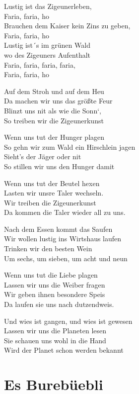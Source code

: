 \documentclass[
  letterpaper,
  twoside=false]{scrbook}
\begin{document}
Lustig ist das Zigeunerleben,\\
Faria, faria, ho\\
Brauchen dem Kaiser kein Zins zu geben,\\
Faria, faria, ho\\
Lustig ist´s im grünen Wald\\
wo des Zigeuners Aufenthalt\\
Faria, faria, faria, faria,\\
Faria, faria, ho

Auf dem Stroh und auf dem Heu\\
Da machen wir uns das größte Feur\\
Blinzt uns nit als wie die Sonn`,\\
So treiben wir die Zigeunerkunst

Wenn uns tut der Hunger plagen\\
So gehn wir zum Wald ein Hirschlein jagen\\
Sieht's der Jäger oder nit\\
So stillen wir uns den Hunger damit

Wenn uns tut der Beutel hexen\\
Lasten wir unsre Taler wechseln.\\
Wir treiben die Zigeunerkunst\\
Da kommen die Taler wieder all zu uns.

Nach dem Essen kommt das Saufen\\
Wir wollen lustig ins Wirtshaus laufen\\
Trinken wir den besten Wein\\
Um sechs, um sieben, um acht und neun

Wenn uns tut die Liebe plagen\\
Lassen wir uns die Weiber fragen\\
Wir geben ihnen besondere Speis\\
Da laufen sie uns nach dutzendweis.

Und wies ist gangen, und wies ist gewesen\\
Lassen wir uns die Planeten lesen\\
Sie schauen uns wohl in die Hand\\
Wird der Planet schon werden bekannt

\hypertarget{es-burebuxfcebli}{%
\chapter{Es Burebüebli}\label{es-burebuxfcebli}}
\end{document}

